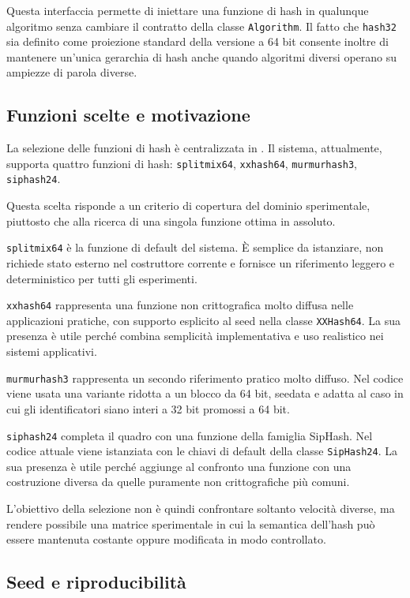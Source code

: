 Questa interfaccia permette di iniettare una funzione di hash in qualunque
algoritmo senza cambiare il contratto della classe \texttt{Algorithm}. Il fatto
che \texttt{hash32} sia definito come proiezione standard della versione a
64 bit consente inoltre di mantenere un'unica gerarchia di hash anche quando
algoritmi diversi operano su ampiezze di parola diverse.

\subsection{Funzioni scelte e motivazione}

La selezione delle funzioni di hash è centralizzata in
. Il sistema, attualmente, supporta quattro funzioni di hash:
\texttt{splitmix64}, \texttt{xxhash64}, \texttt{murmurhash3}, \texttt{siphash24}.

Questa scelta risponde a un criterio di copertura del dominio sperimentale,
piuttosto che alla ricerca di una singola funzione ottima in assoluto.

\texttt{splitmix64} è la funzione di default del sistema. È semplice da
istanziare, non richiede stato esterno nel costruttore corrente e fornisce un
riferimento leggero e deterministico per tutti gli esperimenti.

\texttt{xxhash64} rappresenta una funzione non crittografica molto diffusa nelle
applicazioni pratiche, con supporto esplicito al seed nella classe
\texttt{XXHash64}. La sua presenza è utile perché combina semplicità
implementativa e uso realistico nei sistemi applicativi.

\texttt{murmurhash3} rappresenta un secondo riferimento pratico molto diffuso.
Nel codice viene usata una variante ridotta a un blocco da 64 bit, seedata e
adatta al caso in cui gli identificatori siano interi a 32 bit promossi a 64
bit.

\texttt{siphash24} completa il quadro con una funzione della famiglia SipHash.
Nel codice attuale viene istanziata con le chiavi di default della classe
\texttt{SipHash24}. La sua presenza è utile perché aggiunge al confronto una
funzione con una costruzione diversa da quelle puramente non crittografiche più
comuni.

L'obiettivo della selezione non è quindi confrontare soltanto velocità diverse,
ma rendere possibile una matrice sperimentale in cui la semantica dell'hash può
essere mantenuta costante oppure modificata in modo controllato.

\subsection{Seed e riproducibilità}

